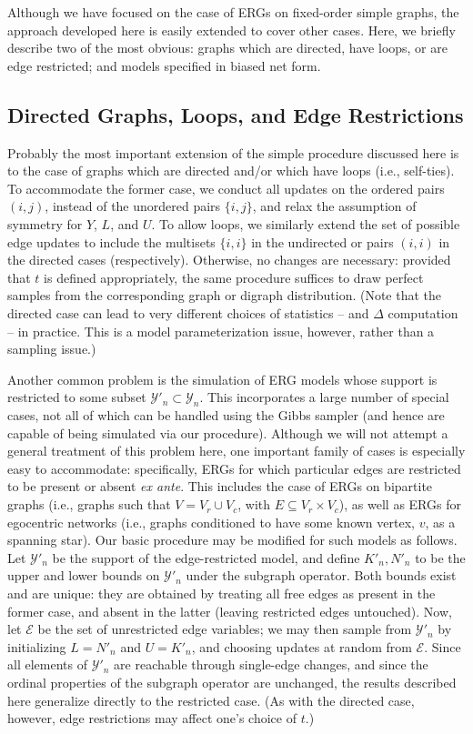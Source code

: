 \documentclass[11pt]{article}
\begin{document}
Although we have focused on the case of ERGs on fixed-order simple graphs, the approach developed here is easily extended to cover other cases.  Here, we briefly describe two of the most obvious: graphs which are directed, have loops, or are edge restricted; and models specified in biased net form.

\subsection{Directed Graphs, Loops, and Edge Restrictions \label{sec_ext_dig}}

Probably the most important extension of the simple procedure discussed here is to the case of graphs which are directed and/or which have loops (i.e., self-ties).  To accommodate the former case, we conduct all updates on the ordered pairs $(i,j)$, instead of the unordered pairs $\{i,j\}$, and relax the assumption of symmetry for $Y$, $L$, and $U$.  To allow loops, we similarly extend the set of possible edge updates to include the multisets $\{i,i\}$ in the undirected or pairs $(i,i)$ in the directed cases (respectively).  Otherwise, no changes are necessary: provided that $t$ is defined appropriately, the same procedure suffices to draw perfect samples from the corresponding graph or digraph distribution.  (Note that the directed case can lead to very different choices of statistics -- and $\Delta$ computation -- in practice.  This is a model parameterization issue, however, rather than a sampling issue.)    

Another common problem is the simulation of ERG models whose support is restricted to some subset $\mathcal{Y}'_n \subset \mathcal{Y}_n$.  This incorporates a large number of special cases, not all of which can be handled using the Gibbs sampler (and hence are capable of being simulated via our procedure).  Although we will not attempt a general treatment of this problem here, one important family of cases is especially easy to accommodate: specifically, ERGs for which particular edges are restricted to be present or absent \emph{ex ante}.  This includes the case of ERGs on bipartite graphs (i.e., graphs such that $V=V_r \cup V_c$, with $E\subseteq V_r \times V_c$), as well as ERGs for egocentric networks (i.e., graphs conditioned to have some known vertex, $v$, as a spanning star).  Our basic procedure may be modified for such models as follows.  Let $\mathcal{Y}'_n$ be the support of the edge-restricted model, and define $K'_n, N'_n$ to be the upper and lower bounds on $\mathcal{Y}'_n$ under the subgraph operator.  Both bounds exist and are unique: they are obtained by treating all free edges as present in the former case, and absent in the latter (leaving restricted edges untouched).  Now, let $\mathcal{E}$ be the set of unrestricted edge variables; we may then sample from $\mathcal{Y}'_n$ by initializing $L=N'_n$ and $U=K'_n$, and choosing updates at random from $\mathcal{E}$.  Since all elements of $\mathcal{Y}'_n$ are reachable through single-edge changes, and since the ordinal properties of the subgraph operator are unchanged, the results described here generalize directly to the restricted case.  (As with the directed case, however, edge restrictions may affect one's choice of $t$.)
\end{document}
